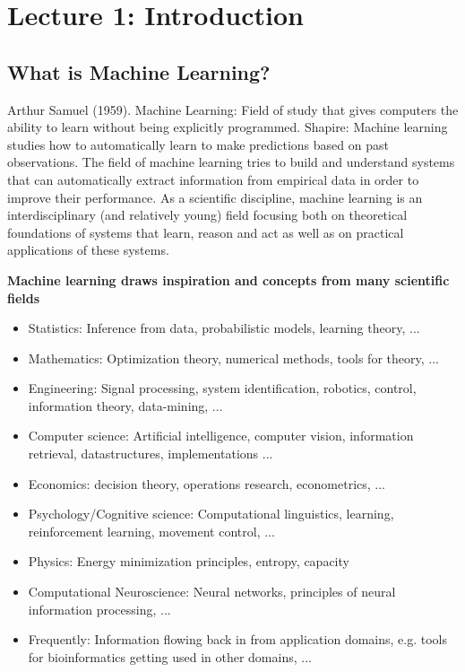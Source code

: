 \section[Introduction]{Lecture 1: Introduction}

\subsection{What is Machine Learning?}
Arthur Samuel (1959). Machine Learning: Field of study that gives computers
the ability to learn without being explicitly programmed.
Shapire: Machine learning studies how to automatically learn to make
predictions based on past observations.
The field of machine learning tries to build and understand systems that can
automatically extract information from empirical data in order to improve their
performance.
As a scientific discipline, machine learning is an interdisciplinary (and relatively
young) field focusing both on theoretical foundations of systems that learn,
reason and act as well as on practical applications of these systems.

\textbf{Machine learning draws inspiration and concepts from many scientific fields}

\begin{itemize}
 \item Statistics: Inference from data, probabilistic models, learning theory, ...
 \item Mathematics: Optimization theory, numerical methods, tools for theory, ...
 \item Engineering: Signal processing, system identification, robotics, control, information
theory, data-mining, ...
 \item Computer science: Artificial intelligence, computer vision, information retrieval, datastructures,
implementations ...
 \item Economics: decision theory, operations research, econometrics, ...
 \item Psychology/Cognitive science: Computational linguistics, learning, reinforcement
learning, movement control, ...
 \item Physics: Energy minimization principles, entropy, capacity
 \item Computational Neuroscience: Neural networks, principles of neural information
processing, ...
 \item Frequently: Information flowing back in from application domains, e.g. tools for
bioinformatics getting used in other domains, ...
\end{itemize}

